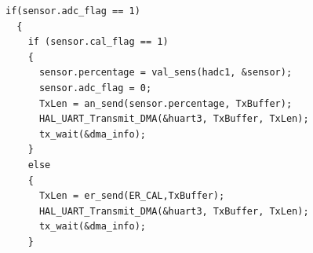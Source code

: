 \newpage

\begin{lstlisting}[caption={\textit{Versenden Messwert}},label={list:Messwert}]
  if(sensor.adc_flag == 1)
  {
    if (sensor.cal_flag == 1)
    {
      sensor.percentage = val_sens(hadc1, &sensor);
      sensor.adc_flag = 0;
      TxLen = an_send(sensor.percentage, TxBuffer);
      HAL_UART_Transmit_DMA(&huart3, TxBuffer, TxLen);
      tx_wait(&dma_info);
    }
    else
    {
      TxLen = er_send(ER_CAL,TxBuffer);
      HAL_UART_Transmit_DMA(&huart3, TxBuffer, TxLen);
      tx_wait(&dma_info);
    }
\end{lstlisting}